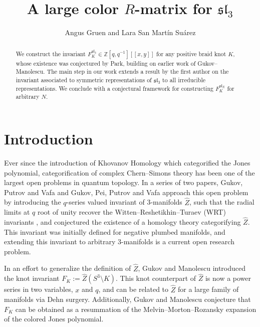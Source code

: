 \documentclass[12pt,oneside,reqno]{amsart}
\numberwithin{teorema}{section}
\numberwithin{definicion}{section}
\numberwithin{lema}{section}
\numberwithin{conjetura}{section}
\numberwithin{proposicion}{section}
\def\sl{\mathfrak{sl}}
\begin{document}
\title[A large color $R$-matrix for $\sl_3$]{A large color $R$-matrix for $\sl_3$}
\author{Angus Gruen and Lara San Mart\'in Su\'arez}
\date{}
\begin{abstract}
    We construct the invariant $F_K^{\sl_3}\in\mathbb{Z}[q,q^{-1}][[x,y]]$ for any positive braid knot $K$, whose existence was conjectured by Park, building on earlier work of Gukov--Manolescu. The main step in our work extends a result by the first author on the invariant associated to symmetric representations of $\sl_3$ to all irreducible representations. We conclude with a conjectural framework for constructing $F_K^{\sl_N}$ for arbitrary $N$.
\end{abstract}
\maketitle

\section{Introduction}

Ever since the introduction of Khovanov Homology \cite{Kh} which categorified the Jones polynomial, categorification of complex Chern--Simons theory has been one of the largest open problems in quantum topology. In a series of two papers, Gukov, Putrov and Vafa \cite{GPV} and Gukov, Pei, Putrov and Vafa \cite{GPPV} approach this open problem by introducing the $q$-series valued invariant of 3-manifolds $\hat{Z}$, such that the radial limits at $q$ root of unity recover the Witten--Reshetikhin--Turaev (WRT) invariants \cite{Witten,RT}, and conjectured the existence of a homology theory categorifying $\hat{Z}$. This invariant was initially defined for negative plumbed manifolds, and extending this invariant to arbitrary 3-manifolds is a current open research problem.

In an effort to generalize the definition of $\hat{Z}$, Gukov and Manolescu \cite{GM} introduced the knot invariant $F_K:=\hat{Z}(S^3\setminus K)$. This knot counterpart of $\hat{Z}$ is now a power series in two variables, $x$ and $q$, and can be related to $\hat{Z}$ for a large family of manifolds via Dehn surgery. Additionally, Gukov and Manolescu conjecture that $F_K$ can be obtained as a resummation of the Melvin--Morton--Rozansky expansion of the colored Jones polynomial.
\end{document}
